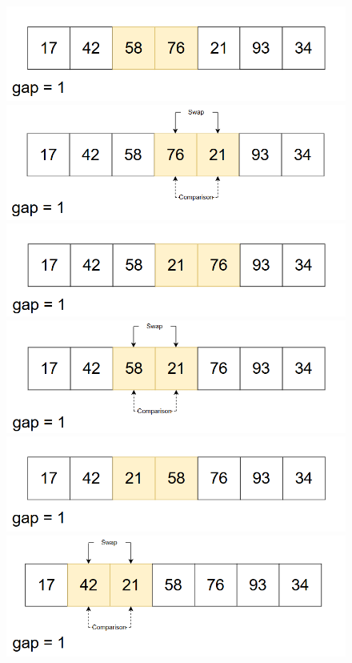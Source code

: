 \begin{figure}[H]
    \centering
    \includegraphics[width=0.5\linewidth]{img/shell_sort/10.png}
    \vspace{0.15cm}

    \includegraphics[width=0.5\linewidth]{img/shell_sort/11.png}
    \vspace{0.15cm}

    \includegraphics[width=0.5\linewidth]{img/shell_sort/12.png}
    \vspace{0.15cm}

    \includegraphics[width=0.5\linewidth]{img/shell_sort/13.png}
    \vspace{0.15cm}

    \includegraphics[width=0.5\linewidth]{img/shell_sort/14.png}
    \vspace{0.15cm}

    \includegraphics[width=0.5\linewidth]{img/shell_sort/15.png}
    \vspace{0.15cm}


\end{figure}

